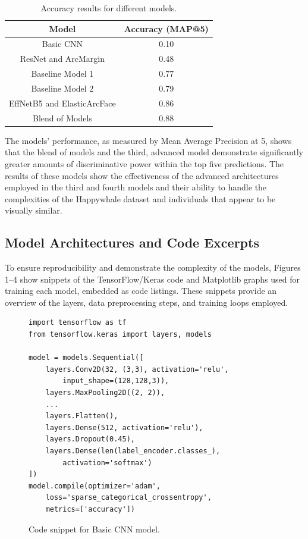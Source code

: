 \documentclass[twocolumn]{article}
\begin{document}
\begin{table}[ht!]
\centering
\begin{tabular}{|c|c|}
\hline
\textbf{Model} & \textbf{Accuracy (MAP@5)}\\ 
\hline
Basic CNN & 0.10 \\ 
\hline
ResNet and ArcMargin & 0.48 \\ 
\hline
Baseline Model 1 & 0.77 \\
\hline
Baseline Model 2 & 0.79 \\
\hline
EffNetB5 and ElasticArcFace & 0.86 \\ 
\hline
Blend of Models & 0.88 \\ 
\hline
\end{tabular}
\caption{Accuracy results for different models.}
\label{tab:model_accuracy}
\end{table}

The models’ performance, as measured by Mean Average Precision at 5, shows that the blend of models and the third, advanced model demonstrate significantly greater amounts of discriminative power within the top five predictions. The results of these models show the effectiveness of the advanced architectures employed in the third and fourth models and their ability to handle the complexities of the Happywhale dataset and individuals that appear to be visually similar.

\subsection{Model Architectures and Code Excerpts}

To ensure reproducibility and demonstrate the complexity of the models, Figures 1–4 show snippets of the TensorFlow/Keras code and Matplotlib graphs used for training each model, embedded as code listings. These snippets provide an overview of the layers, data preprocessing steps, and training loops employed.

\lstset{
    language=Python,
    basicstyle=\footnotesize\ttfamily,
    breaklines=true,
    columns=fullflexible,
    frame=single
}

\begin{figure}[H]
\centering
\begin{minipage}{0.95\linewidth}
\begin{lstlisting}
import tensorflow as tf
from tensorflow.keras import layers, models

model = models.Sequential([
    layers.Conv2D(32, (3,3), activation='relu',
        input_shape=(128,128,3)),
    layers.MaxPooling2D((2, 2)),
    ...
    layers.Flatten(),
    layers.Dense(512, activation='relu'),
    layers.Dropout(0.45),
    layers.Dense(len(label_encoder.classes_),
        activation='softmax')
])
model.compile(optimizer='adam', 
    loss='sparse_categorical_crossentropy', 
    metrics=['accuracy'])
\end{lstlisting}
\end{minipage}
\caption{Code snippet for Basic CNN model.}
\label{fig:model1}
\end{figure}
\end{document}
